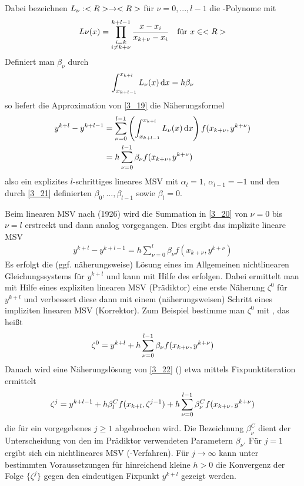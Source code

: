 Dabei bezeichnen $L_\nu:<R>\to<R>$ für $\nu=0,...,l-1$ die -Polynome mit
\begin{align}
	L\nu(x) = \prod_{\substack{i=k \\ i\neq k+\nu}}^{k+l-1} \frac{x-x_i}{x_{k+\nu} - x_i} \quad\text{für } x\in<R>\notag
\end{align}
Definiert man $\beta_\nu$ durch
\begin{align}
	\label{3_21}
	\int_{x_{k+l-1}}^{x_{k+l}} L_\nu(x)\,\mathrm{d} x=h\beta_\nu
\end{align}
so liefert die Approximation von \cref{3_19} die Näherungsformel
\begin{align}
	y^{k+l}-y^{k+l-1} &= \sum_{\nu=0}^{l-1} \left(\int_{x_{k+l-1}}^{x_{k+l}} L_\nu(x)\,\mathrm{d} x\right)f(x_{k+\nu},y^{k+\nu}) \notag \\
	&= h\sum_{\nu=0}^{l-1} \beta_\nu f(x_{k+\nu},y^{k+\nu}) \notag
\end{align}
also ein explizites $l$-schrittiges lineares MSV mit $\alpha_l=1$, $\alpha_{l-1}=-1$ und den durch \cref{3_21} definierten $\beta_0,...,\beta_{l-1}$ sowie $\beta_l=0$.

Beim linearen MSV nach  (1926) wird die Summation in \cref{3_20} von $\nu=0$ bis $\nu=l$ erstreckt und dann analog vorgegangen. Dies ergibt das implizite lineare MSV
\begin{align}
	\label{3_22}
	y^{k+l} - y^{k+l-1} = h\sum_{\nu=0}^l \beta_\nu f(x_{k+\nu},y^{k+\nu})
\end{align}
Es erfolgt die (ggf. näherungsweise) Lösung eines im Allgemeinen nichtlinearen Gleichungssystems für $y^{k+l}$ und kann mit Hilfe des  erfolgen. Dabei ermittelt man mit Hilfe eines expliziten linearen MSV (Prädiktor) eine erste Näherung $\zeta^0$ für $y^{k+l}$ und verbessert diese dann mit einem (näherungsweisen) Schritt eines impliziten linearen MSV (Korrektor). Zum Beispiel bestimme man $\zeta^0$ mit , das heißt
\begin{align}
	\zeta^0 = y^{k+l} + h\sum_{\nu=0}^{l-1} \beta_\nu f(x_{k+\nu},y^{k+\nu}) \notag
\end{align}
Danach wird eine Näherungslösung von \cref{3_22} () etwa mittels Fixpunktiteration ermittelt
\begin{align}
	\zeta^j = y^{k+l-1} + h\beta_l^C f(x_{k+l},\zeta^{j-1}) + h\sum_{\nu=0}^{l-1} \beta_\nu^C f(x_{k+\nu},y^{k+\nu}) \notag
\end{align}
die für ein vorgegebenes $j\ge 1$ abgebrochen wird. Die Bezeichnung $\beta_\nu^C$ dient der Unterscheidung von den im Prädiktor verwendeten Parametern $\beta_\nu$. Für $j=1$ ergibt sich ein nichtlineares MSV (-Verfahren). Für $j\to\infty$ kann unter bestimmten Voraussetzungen für hinreichend kleine $h>0$ die Konvergenz der Folge $\{\zeta^j\}$ gegen den eindeutigen Fixpunkt $y^{k+l}$ gezeigt werden.

